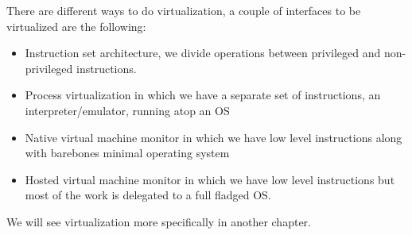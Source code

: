 There are different ways to do virtualization, a couple of interfaces to be virtualized are the following:
\begin{itemize}
    \item Instruction set architecture, we divide operations between privileged and non-privileged instructions.
    \item Process virtualization in which we have a separate set of instructions, an interpreter/emulator, running atop an OS
    \item Native virtual machine monitor in which we have low level instructions along with barebones minimal operating system
    \item Hosted virtual machine monitor in which we have low level instructions but most of the work is delegated to a full fladged OS.
\end{itemize}
We will see virtualization more specifically in another chapter.